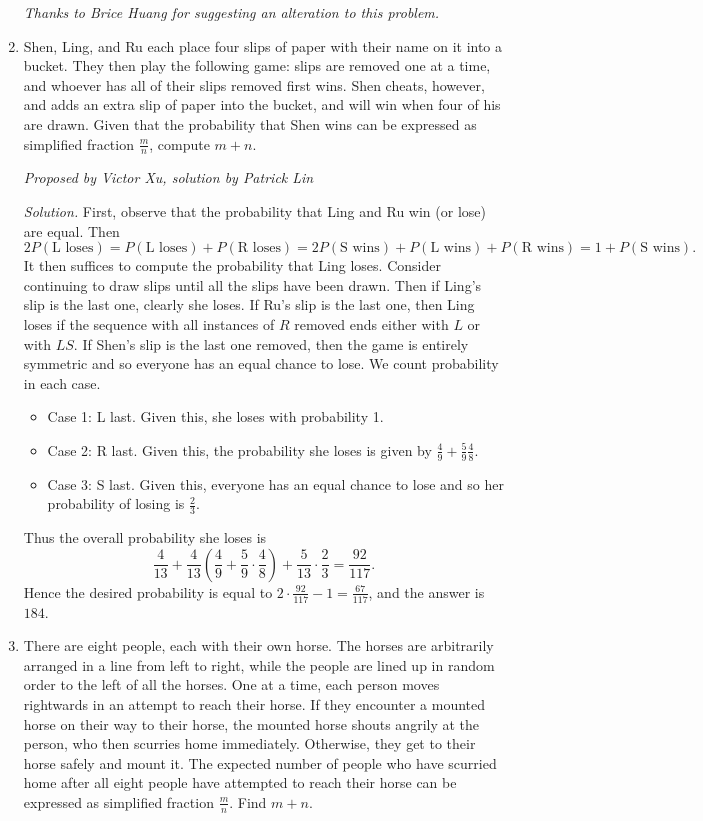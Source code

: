 \documentclass[10pt]{article}
\newcommand{\proposed}[1]
{
\vspace{5pt}
\noindent\textit{Proposed by #1}
}
\newcommand{\solution}
{
\vspace{5pt}
\noindent\textit{Solution.}\qquad
}
\begin{document}
\begin{enumerate}
\par \textit{Thanks to Brice Huang for suggesting an alteration to this problem.}

\item Shen, Ling, and Ru each place four slips of paper with their name on it into a bucket. They then play the following game: slips are removed one at a time, and whoever has all of their slips removed first wins. Shen cheats, however, and adds an extra slip of paper into the bucket, and will win when four of his are drawn. Given that the probability that Shen wins can be expressed as simplified fraction $\tfrac{m}{n}$, compute $m+n$.

\proposed{Victor Xu, solution by Patrick Lin}

\solution First, observe that the probability that Ling and Ru win (or lose) are equal. Then
\[2P(\text{L loses}) = P(\text{L loses}) + P(\text{R loses}) = 2P(\text{S wins}) + P(\text{L wins}) + P(\text{R wins}) = 1 + P(\text{S wins}).\]
It then suffices to compute the probability that Ling loses. Consider continuing to draw slips until all the slips have been drawn. Then if Ling’s slip is the last one, clearly she loses. If Ru’s slip is the last one, then Ling loses if the sequence with all instances of $R$ removed ends either with $L$ or with $LS$. If Shen’s slip is the last one removed, then the game is entirely symmetric and so everyone has an equal chance to lose. We count probability in each case.
\begin{itemize}
\item Case 1: L last. Given this, she loses with probability 1.
\item Case 2: R last. Given this, the probability she loses is given by $\tfrac49+\tfrac59\tfrac48$.
\item Case 3: S last. Given this, everyone has an equal chance to lose and so her probability of losing is $\tfrac23$.
\end{itemize}
Thus the overall probability she loses is
\[\frac{4}{13}+\frac{4}{13}\left(\frac49+\frac59\cdot\frac48\right) + \frac{5}{13}\cdot\frac23 = \frac{92}{117}.\]
Hence the desired probability is equal to $2\cdot\tfrac{92}{117} - 1 = \tfrac{67}{117}$, and the answer is $\boxed{184}$.

\item There are eight people, each with their own horse. The horses are arbitrarily arranged in a line from left to right, while the people are lined up in random order to the left of all the horses. One at a time, each person moves rightwards in an attempt to reach their horse. If they encounter a mounted horse on their way to their horse, the mounted horse shouts angrily at the person, who then scurries home immediately. Otherwise, they get to their horse safely and mount it. The expected number of people who have scurried home after all eight people have attempted to reach their horse can be expressed as simplified fraction $\tfrac{m}{n}$. Find $m+n$.


\end{enumerate}
\end{document}

